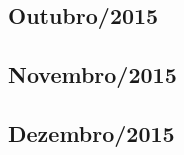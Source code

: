 \documentclass[12pt,a4paper]{article}
\begin{document}
%   
% 
\subsection{Outubro/2015}
  
   
%   

\subsection{Novembro/2015}
  
   
%   

\subsection{Dezembro/2015}
  
      
%   


\end{document}
